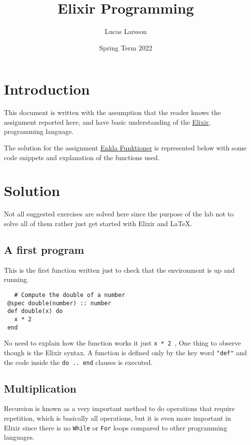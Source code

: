 \documentclass{article}
\title{Elixir Programming}
\author{Lucas Larsson}
\date{Spring Term 2022}
\begin{document}
\maketitle



\section{Introduction}

This document is written with the assumption that the reader knows the assignment reported here, and have basic understanding of the \href{https://elixir-lang.org}{Elixir}, programming language. 

The solution for the assignment \href{https://canvas.kth.se/courses/31579/assignments/192010}{Enkla Funktioner} is represented below with some code snippets and explanation of the functions used. 




\section{Solution}
Not all suggested exercises are solved here since the purpose of the lab not to solve all of them rather just get started with Elixir and \LaTeX{}.


\subsection{A first program}

This is the first function written just to check that the environment is up and running. 
\begin{verbatim}
   # Compute the double of a number
 @spec double(number) :: number
 def double(x) do
   x * 2
 end
\end{verbatim}

No need to explain how the function works it just {\tt x * 2 }, One thing to observe though is the Elixir syntax. A function is defined only by the key word {\tt "def"} and the code inside the {\tt do .. end} clauses is executed.

\subsection{Multiplication}

Recursion is known as a very important method to do operations that require repetition, which is basically all operations, but it is even more important in Elixir since there is no {\tt While}  or {\tt For} loops compared to other programming languages.    
\end{document}
